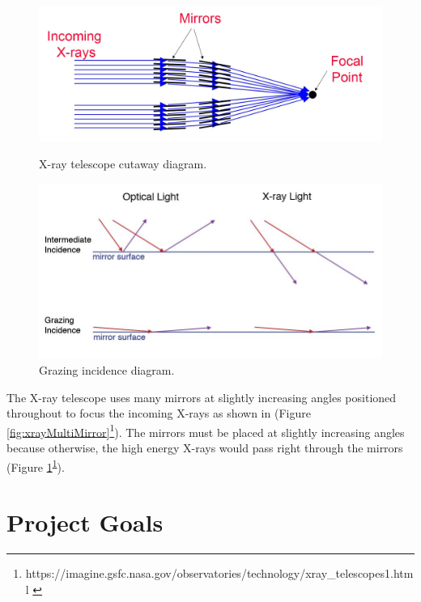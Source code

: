 \documentclass[12pt, oneside]{smuthesis}
\begin{document}
\begin{figure}[H]
	\centering
	\begin{minipage}{0.45\textwidth}
		\centering
		\includegraphics[width=\linewidth]{xrayTelescopeMultimirror}
		\caption{X-ray telescope cutaway diagram.}
		\label{fig:xrayMultiMirror}
	\end{minipage}
	\begin{minipage}{0.45\textwidth}
		\centering
		\includegraphics[width=\linewidth]{grazingIncidence}
		\caption{Grazing incidence diagram.}
		\label{fig:grazingIncidence}
	\end{minipage}
\end{figure}

The X-ray telescope uses many mirrors at slightly increasing angles positioned throughout to focus the incoming X-rays as shown in (Figure \ref{fig:xrayMultiMirror}\footnote{https://imagine.gsfc.nasa.gov/observatories/technology/xray\_telescopes1.html \label{xrayTelescopeRef}}). The mirrors must be placed at slightly increasing angles because otherwise, the high energy X-rays would pass right through the mirrors (Figure \ref{fig:grazingIncidence}\textsuperscript{\ref{xrayTelescopeRef}}).

\section{\sc Project Goals} \label{expectedAchievements}
\end{document}
